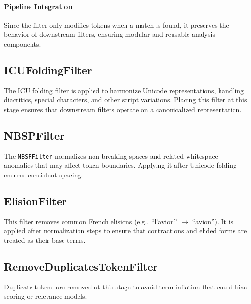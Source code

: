 \paragraph{Pipeline Integration}

Since the filter only modifies tokens when a match is found, it preserves the behavior of downstream filters, ensuring modular and reusable analysis components.


\subsection{ICUFoldingFilter}
The ICU folding filter is applied to harmonize Unicode representations, handling diacritics, special characters, and other script variations. Placing this filter at this stage ensures that downstream filters operate on a canonicalized representation.

\subsection{NBSPFilter}
The \texttt{NBSPFilter} normalizes non-breaking spaces and related whitespace anomalies that may affect token boundaries. Applying it after Unicode folding ensures consistent spacing.

\subsection{ElisionFilter}
This filter removes common French elisions (e.g., ``l'avion'' $\rightarrow$ ``avion''). It is applied after normalization steps to ensure that contractions and elided forms are treated as their base terms.

\subsection{RemoveDuplicatesTokenFilter}
Duplicate tokens are removed at this stage to avoid term inflation that could bias scoring or relevance models.


